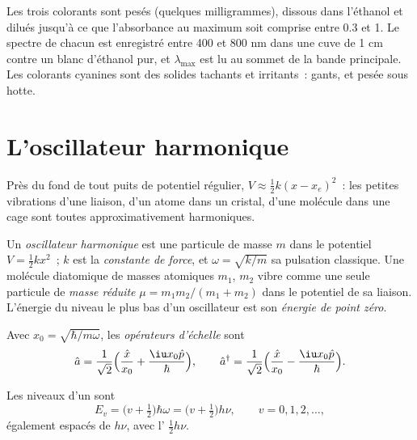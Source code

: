 \begin{inthelab}
Les trois colorants sont pesés (quelques milligrammes), dissous dans
l'éthanol et dilués jusqu'à ce que l'absorbance au maximum soit comprise
entre 0.3 et 1. Le spectre de chacun est enregistré entre 400 et 800 nm
dans une cuve de 1 cm contre un blanc d'éthanol pur, et $\lambda_{\max}$
est lu au sommet de la bande principale. Les colorants cyanines sont des
solides tachants et irritants~: gants, et pesée sous hotte.
\end{inthelab}

\section{L'oscillateur harmonique}

Près du fond de tout puits de potentiel régulier, $V \approx \frac12 k(x - x_e)^2$~:
les petites vibrations d'une liaison, d'un atome dans un cristal, d'une
molécule dans une cage sont toutes approximativement harmoniques.

\begin{definition}\label{def:b3:quantum-model-systems:oscillator}
Un \emph{oscillateur harmonique} est une particule de
masse $m$ dans le potentiel $V = \frac12 kx^2$~; $k$ est la \emph{constante
de force}, et $\omega = \sqrt{k/m}$ sa pulsation
classique. Une molécule diatomique de masses atomiques $m_1$, $m_2$
vibre comme une seule particule de \emph{masse réduite}
$\mu = m_1m_2/(m_1 + m_2)$ dans le potentiel de sa liaison. L'énergie du
niveau le plus bas d'un oscillateur est son \emph{énergie de point
zéro}.
\end{definition}

\begin{definition}\label{def:b3:quantum-model-systems:ladder}
Avec $x_0 = \sqrt{\hbar/m\omega}$, les \emph{opérateurs d'échelle}
sont
\[
\hat a = \frac{1}{\sqrt2}\Big(\frac{\hat x}{x_0} + \frac{\iu x_0\hat p}{\hbar}\Big),
\qquad \hat a^\dagger = \frac{1}{\sqrt2}\Big(\frac{\hat x}{x_0} -
\frac{\iu x_0\hat p}{\hbar}\Big).
\]
\end{definition}

\begin{theorem}\label{thm:b3:quantum-model-systems:oscillator}
Les niveaux d'un  sont
\[
E_v = \big(v + \tfrac12\big)\hbar\omega = \big(v + \tfrac12\big)h\nu, \qquad v =
0, 1, 2, \dots,
\]
également espacés de $h\nu$, avec l' $\frac12h\nu$.
\end{theorem}


